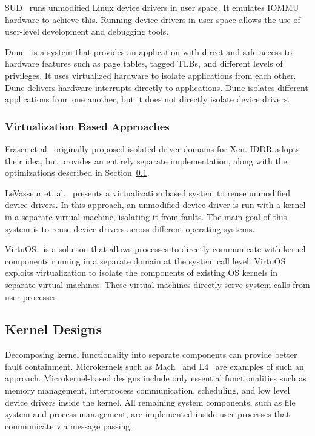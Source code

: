 SUD~\cite{Boyd-Wickizer+:atc2010} runs unmodified Linux device drivers
in user space. It emulates IOMMU hardware to achieve this.
Running device drivers in user space allows the use of user-level
development and debugging tools.

Dune~\cite{Belay+:osdi12} is a system that provides an application with direct
and safe access to hardware features such as page tables, tagged
TLBs, and different levels of privileges. It uses virtualized hardware to isolate
applications from each other. Dune delivers hardware interrupts
directly to applications.
Dune isolates different applications from one another, but 
it does not directly isolate device drivers.

\subsubsection*{Virtualization Based Approaches}

Fraser et al~\cite{Fraser04safehardware} originally proposed
isolated driver domains for Xen.  IDDR adopts their idea, but provides
an entirely separate implementation, along with the optimizations described
in Section~\ref{}.

LeVasseur et. al.~\cite{LeVasseur04UnmodifiedDriverReuse} presents
a virtualization based system to reuse unmodified device drivers. 
In this approach, an unmodified device
driver is run with a kernel in a separate virtual machine, isolating
it from faults. The main goal of this system is to reuse device drivers 
across different operating systems. 

VirtuOS~\cite{Nikolaev:2013:VOS:2517349.2522719} is a 
solution that allows processes to directly communicate with kernel
components running in a separate domain at the system call level. 
VirtuOS exploits virtualization to isolate the components of
existing OS kernels in separate virtual machines. 
These virtual machines directly serve system calls from user processes.

\subsection{Kernel Designs}
Decomposing kernel functionality into separate components can provide
better fault containment. 
Microkernels such as Mach~\cite{Accetta+:usenix86} and L4~\cite{Liedtke+:sosp95} 
are examples of such an approach. 
Microkernel-based designs include
only essential functionalities such as memory management, interprocess
communication, scheduling, and low level device drivers inside the kernel.
All remaining system components, such as file system and process
management, are implemented inside user processes that communicate
via message passing.

